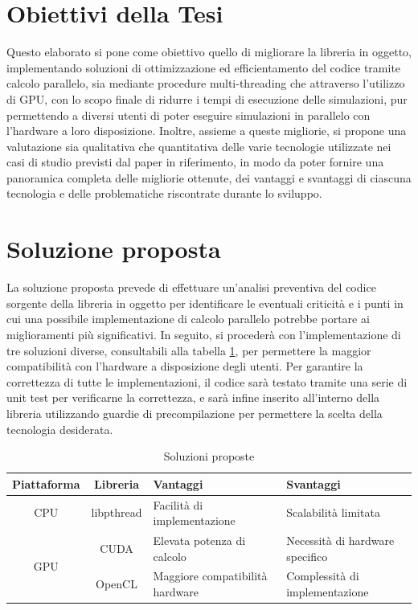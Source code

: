 \section{Obiettivi della Tesi}
\label{sec:obiettivi}

Questo elaborato si pone come obiettivo quello di migliorare la libreria in
oggetto, implementando soluzioni di ottimizzazione ed efficientamento del codice
tramite calcolo parallelo, sia mediante procedure multi-threading che attraverso
l'utilizzo di GPU, con lo scopo finale di ridurre i tempi di esecuzione delle simulazioni,
pur permettendo a diversi utenti di poter eseguire simulazioni in parallelo con
l'hardware a loro disposizione. Inoltre, assieme a queste migliorie, si propone una
valutazione sia qualitativa che quantitativa delle varie tecnologie utilizzate nei
casi di studio previsti dal paper in riferimento\cite{cooperis}, in modo da poter
fornire una panoramica completa delle migliorie ottenute, dei vantaggi e
svantaggi di ciascuna tecnologia e delle problematiche riscontrate durante lo
sviluppo.

\section{Soluzione proposta}
\label{sec:soluzione}

La soluzione proposta prevede di effettuare un'analisi preventiva del codice sorgente
della libreria in oggetto per identificare le eventuali criticità e i punti in cui
una possibile implementazione di calcolo parallelo potrebbe portare ai miglioramenti
più significativi. In seguito, si procederà con l'implementazione di tre soluzioni
diverse, consultabili alla tabella \ref{tab:soluzioni}, per permettere la maggior
compatibilità con l'hardware a disposizione degli utenti. Per garantire la
correttezza di tutte le implementazioni, il codice sarà testato tramite una serie
di unit test per verificarne la correttezza, e sarà infine inserito all'interno
della libreria utilizzando guardie di precompilazione per permettere la scelta
della tecnologia desiderata.

\begin{table}[ht]
  \begin{center}
    \begin{tabular}{ |c|c|l|l| }
      \hline
      \textbf{Piattaforma} & \textbf{Libreria} & \textbf{Vantaggi}               & \textbf{Svantaggi}              \\
      \hline
      CPU                  & libpthread        & Facilità di implementazione     & Scalabilità limitata            \\
      \hline
      \multirow{2}{*}{GPU} & CUDA              & Elevata potenza di calcolo      & Necessità di hardware specifico \\
      \cline{2-4}          & OpenCL            & Maggiore compatibilità hardware & Complessità di implementazione  \\
      \hline
    \end{tabular}
    \caption{Soluzioni proposte}
    \label{tab:soluzioni}
  \end{center}
\end{table}